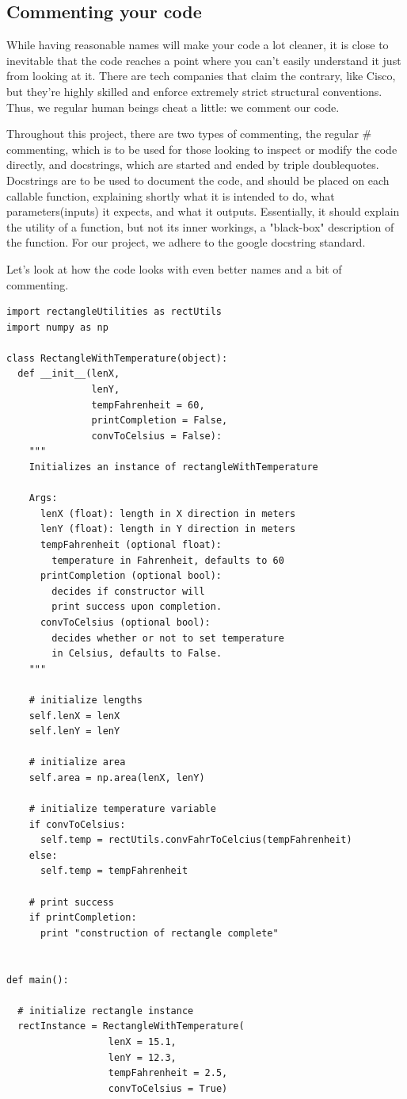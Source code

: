 \documentclass[10pt,a4paper]{article}
\begin{document}
\subsection{Commenting your code}
While having reasonable names will make your code a lot cleaner, it is close to inevitable that the code reaches a point where you can't easily understand it just from looking at it. There are tech companies that claim the contrary, like Cisco, but they're highly skilled and enforce extremely strict structural conventions. Thus, we regular human beings cheat a little: we comment our code. 

Throughout this project, there are two types of commenting, the regular \# commenting, which is to be used for those looking to inspect or modify the code directly, and docstrings, which are started and ended by triple doublequotes. Docstrings are to be used to document the code, and should be placed on each callable function, explaining shortly what it is intended to do, what parameters(inputs) it expects, and what it outputs. Essentially, it should explain the utility of a function, but not its inner workings, a "black-box" description of the function. For our project, we adhere to the google docstring standard.

Let's look at how the code looks with even better names and a bit of commenting.  

\begin{lstlisting}
import rectangleUtilities as rectUtils
import numpy as np

class RectangleWithTemperature(object):
  def __init__(lenX, 
               lenY, 
               tempFahrenheit = 60, 
               printCompletion = False,
               convToCelsius = False):
    """
    Initializes an instance of rectangleWithTemperature
    
    Args: 
      lenX (float): length in X direction in meters
      lenY (float): length in Y direction in meters
      tempFahrenheit (optional float): 
        temperature in Fahrenheit, defaults to 60
      printCompletion (optional bool):
        decides if constructor will 
        print success upon completion.
      convToCelsius (optional bool): 
        decides whether or not to set temperature 
        in Celsius, defaults to False.
    """
    
    # initialize lengths
    self.lenX = lenX
    self.lenY = lenY
    
    # initialize area
    self.area = np.area(lenX, lenY)
	
    # initialize temperature variable
    if convToCelsius:
      self.temp = rectUtils.convFahrToCelcius(tempFahrenheit)
    else:
      self.temp = tempFahrenheit

    # print success    
    if printCompletion:
      print "construction of rectangle complete"


def main():

  # initialize rectangle instance
  rectInstance = RectangleWithTemperature(
                  lenX = 15.1, 
                  lenY = 12.3, 
                  tempFahrenheit = 2.5, 
                  convToCelsius = True)
	
\end{lstlisting}
\end{document}
